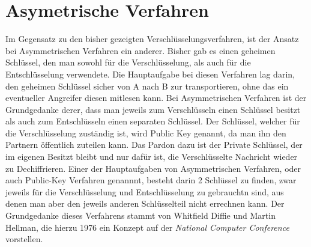 \documentclass[10pt, a4paper,headsepline]{scrreprt}
\begin{document}
\section{Asymetrische Verfahren}
Im Gegensatz zu den bisher gezeigten Verschlüsselungsverfahren, ist der Ansatz bei Asymmetrischen Verfahren ein anderer. Bisher gab es einen geheimen Schlüssel, den man sowohl für die Verschlüsselung, als auch für die Entschlüsselung verwendete. Die Hauptaufgabe bei diesen Verfahren lag darin, den geheimen Schlüssel sicher von A nach B zur transportieren, ohne das ein eventueller Angreifer diesen mitlesen kann. Bei Asymmetrischen Verfahren ist der Grundgedanke derer, dass man jeweils zum Verschlüsseln einen Schlüssel besitzt als auch zum Entschlüsseln einen separaten Schlüssel. Der Schlüssel, welcher für die Verschlüsselung zuständig ist, wird Public Key genannt, da man ihn den Partnern öffentlich zuteilen kann. Das Pardon dazu ist der Private Schlüssel, der im eigenen Besitzt bleibt und nur dafür ist, die Verschlüsselte Nachricht wieder zu Dechiffrieren. Einer der Hauptaufgaben von Asymmetrischen Verfahren, oder auch Public-Key Verfahren genannnt, besteht darin 2 Schlüssel zu finden, zwar jeweils für die Verschlüsselung und Entschlüsselung zu gebrauchtn sind, aus denen man aber den jeweils anderen Schlüsselteil nicht errechnen kann. Der Grundgedanke dieses Verfahrens stammt von Whitfield Diffie und Martin Hellman, die hierzu 1976 ein Konzept auf der \textit{National Computer Conference} vorstellen. 
\end{document}

